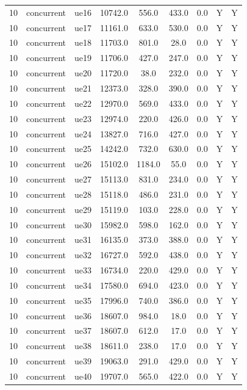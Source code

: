 \begin{table}[ht]
\begin{tabular}{|c|c|c|c|c|c|c|c|c|}
10 & concurrent & ue16 & 10742.0 & 556.0 & 433.0 & 0.0 & Y & Y \\
10 & concurrent & ue17 & 11161.0 & 633.0 & 530.0 & 0.0 & Y & Y \\
10 & concurrent & ue18 & 11703.0 & 801.0 & 28.0 & 0.0 & Y & Y \\
10 & concurrent & ue19 & 11706.0 & 427.0 & 247.0 & 0.0 & Y & Y \\
10 & concurrent & ue20 & 11720.0 & 38.0 & 232.0 & 0.0 & Y & Y \\
10 & concurrent & ue21 & 12373.0 & 328.0 & 390.0 & 0.0 & Y & Y \\
10 & concurrent & ue22 & 12970.0 & 569.0 & 433.0 & 0.0 & Y & Y \\
10 & concurrent & ue23 & 12974.0 & 220.0 & 426.0 & 0.0 & Y & Y \\
10 & concurrent & ue24 & 13827.0 & 716.0 & 427.0 & 0.0 & Y & Y \\
10 & concurrent & ue25 & 14242.0 & 732.0 & 630.0 & 0.0 & Y & Y \\
10 & concurrent & ue26 & 15102.0 & 1184.0 & 55.0 & 0.0 & Y & Y \\
10 & concurrent & ue27 & 15113.0 & 831.0 & 234.0 & 0.0 & Y & Y \\
10 & concurrent & ue28 & 15118.0 & 486.0 & 231.0 & 0.0 & Y & Y \\
10 & concurrent & ue29 & 15119.0 & 103.0 & 228.0 & 0.0 & Y & Y \\
10 & concurrent & ue30 & 15982.0 & 598.0 & 162.0 & 0.0 & Y & Y \\
10 & concurrent & ue31 & 16135.0 & 373.0 & 388.0 & 0.0 & Y & Y \\
10 & concurrent & ue32 & 16727.0 & 592.0 & 438.0 & 0.0 & Y & Y \\
10 & concurrent & ue33 & 16734.0 & 220.0 & 429.0 & 0.0 & Y & Y \\
10 & concurrent & ue34 & 17580.0 & 694.0 & 423.0 & 0.0 & Y & Y \\
10 & concurrent & ue35 & 17996.0 & 740.0 & 386.0 & 0.0 & Y & Y \\
10 & concurrent & ue36 & 18607.0 & 984.0 & 18.0 & 0.0 & Y & Y \\
10 & concurrent & ue37 & 18607.0 & 612.0 & 17.0 & 0.0 & Y & Y \\
10 & concurrent & ue38 & 18611.0 & 238.0 & 17.0 & 0.0 & Y & Y \\
10 & concurrent & ue39 & 19063.0 & 291.0 & 429.0 & 0.0 & Y & Y \\
10 & concurrent & ue40 & 19707.0 & 565.0 & 422.0 & 0.0 & Y & Y \\

\end{tabular}
\end{table}
